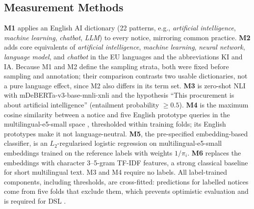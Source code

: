 \documentclass[runningheads]{llncs}
\begin{document}
\subsection{Measurement Methods}
\textbf{M1} applies an English AI dictionary (22 patterns, e.g., \textit{artificial intelligence}, \textit{machine learning}, \textit{chatbot}, \textit{LLM}) to every notice, mirroring common practice. \textbf{M2} adds core equivalents of \textit{artificial intelligence}, \textit{machine learning}, \textit{neural network}, \textit{language model}, and \textit{chatbot} in the EU languages and the abbreviations KI and IA. Because M1 and M2 define the sampling strata, both were fixed before sampling and annotation; their comparison contrasts two usable dictionaries, not a pure language effect, since M2 also differs in its term set. \textbf{M3} is zero-shot NLI with mDeBERTa-v3-base-mnli-xnli \cite{he2023,yin2019} and the hypothesis ``This procurement is about artificial intelligence'' (entailment probability $\ge 0.5$). \textbf{M4} is the maximum cosine similarity between a notice and five English prototype queries in the multilingual-e5-small space \cite{wang2024me5}, thresholded within training folds; its English prototypes make it not language-neutral. \textbf{M5}, the pre-specified embedding-based classifier, is an $L_2$-regularised logistic regression on multilingual-e5-small embeddings trained on the reference labels with weights $1/\pi_i$. \textbf{M6} replaces the embeddings with character 3--5-gram TF-IDF features, a strong classical baseline for short multilingual text. M3 and M4 require no labels. All label-trained components, including thresholds, are cross-fitted: predictions for labelled notices come from five folds that exclude them, which prevents optimistic evaluation and is required for DSL \cite{egami2023}. %
\end{document}
